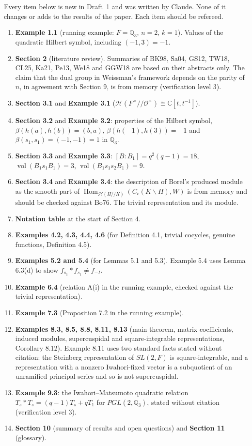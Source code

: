 \documentclass[12pt,letterpaper]{amsart}
\begin{document}
Every item below is new in Draft~1 and was written by Claude. None of it
changes or adds to the results of the paper. Each item should be refereed.
\begin{enumerate}
\item \textbf{Example 1.1} (running example: $F=\mathbb{Q}_3$, $n=2$, $k=1$).
Values of the quadratic Hilbert symbol, including $(-1,3)=-1$.
\item \textbf{Section 2} (literature review). Summaries of BK98, Sa04, GS12,
TW18, CL25, Ka21, Pe13, We18 and GGW18 are based on their abstracts only. The
claim that the dual group in Weissman's framework depends on the parity of
$n$, in agreement with Section 9, is from memory (verification level 3).
\item \textbf{Section 3.1} and \textbf{Example 3.1}
($\mathcal{H}(F^\times//\mathcal{O}^\times)\cong\mathbb{C}[t,t^{-1}]$).
\item \textbf{Section 3.2} and \textbf{Example 3.2}: properties of the Hilbert
symbol, $\beta(h(a),h(b))=(b,a)$, $\beta(h(-1),h(3))=-1$ and
$\beta(s_1,s_1)=(-1,-1)=1$ in $\mathbb{Q}_3$.
\item \textbf{Section 3.3} and \textbf{Example 3.3}: $[B:B_1]=q^2(q-1)=18$,
$\operatorname{vol}(B_1s_1B_1)=3$, $\operatorname{vol}(B_1s_1s_2B_1)=9$.
\item \textbf{Section 3.4} and \textbf{Example 3.4}: the description of
Borel's produced module as the smooth part of
$\operatorname{Hom}_{\mathcal{H}(H//K)}(C_c(K\backslash H),W)$ is from memory
and should be checked against Bo76. The trivial representation and its
module.
\item \textbf{Notation table} at the start of Section 4.
\item \textbf{Examples 4.2, 4.3, 4.4, 4.6} (for Definition 4.1, trivial
cocycles, genuine functions, Definition 4.5).
\item \textbf{Examples 5.2 and 5.4} (for Lemmas 5.1 and 5.3). Example 5.4 uses
Lemma 6.3(d) to show $f_{s_1}*f_{s_1}\neq f_{-I}$.
\item \textbf{Example 6.4} (relation A(i) in the running example, checked
against the trivial representation).
\item \textbf{Example 7.3} (Proposition 7.2 in the running example).
\item \textbf{Examples 8.3, 8.5, 8.8, 8.11, 8.13} (main theorem, matrix
coefficients, induced modules, supercuspidal and square-integrable
representations, Corollary 8.12). Example 8.11 uses two standard facts stated
without citation: the Steinberg representation of $SL(2,F)$ is
square-integrable, and a representation with a nonzero Iwahori-fixed vector
is a subquotient of an unramified principal series and so is not
supercuspidal.
\item \textbf{Example 9.3}: the Iwahori--Matsumoto quadratic relation
$T_s*T_s=(q-1)T_s+qT_1$ for $PGL(2,\mathbb{Q}_3)$, stated without citation
(verification level 3).
\item \textbf{Section 10} (summary of results and open questions) and
\textbf{Section 11} (glossary).
\end{enumerate}
\end{document}
